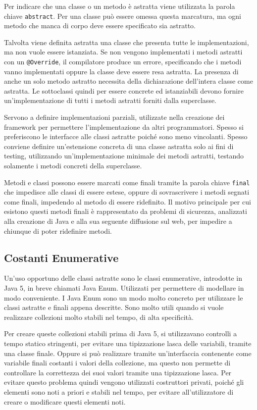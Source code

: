 \documentclass{article}
\numberwithin{equation}{subsection}
\begin{document}
Per indicare che una classe o un metodo è astratta viene utilizzata la parola chiave \verb|abstract|. 
Per una classe può essere omessa questa marcatura, ma ogni metodo che manca di corpo deve essere specificato sia astratto. 

Talvolta viene definita astratta una classe che presenta tutte le implementazioni, ma non vuole essere istanziata. 
Se non vengono implementati i metodi astratti con un \verb|@Override|, il compilatore produce un errore, specificando che i metodi vanno implementati oppure la classe 
deve essere resa astratta. 
La presenza di anche un solo metodo astratto necessita della dichiarazione dell'intera classe come astratta. 
Le sottoclassi quindi per essere concrete ed istanziabili devono fornire un'implementazione di tutti i metodi astratti forniti dalla superclasse. 

Servono a definire implementazioni parziali, utilizzate nella creazione dei framework per permettere l'implementazione da altri programmatori. 
Spesso si preferiscono le interfacce alle classi astratte poiché sono meno vincolanti. 
Spesso conviene definire un'estensione concreta di una classe astratta solo ai fini di testing, utilizzando un'implementazione minimale dei metodi astratti, testando solamente i metodi concreti della superclasse.  


Metodi e classi possono essere marcati come finali tramite la parola chiave \verb|final| che impedisce alle classi di essere estese, oppure di sovrascrivere i metodi 
segnati come finali, impedendo al metodo di essere ridefinito. Il motivo principale per cui esistono questi metodi finali è rappresentato da problemi di sicurezza, 
analizzati alla creazione di Java e alla sua seguente diffusione sul web, per impedire a chiunque di poter ridefinire metodi. 

\subsection{Costanti Enumerative}

Un'uso opportuno delle classi astratte sono le classi enumerative, introdotte in Java 5, in breve chiamati Java Enum. Utilizzati per permettere di modellare in modo 
conveniente. 
I Java Enum sono un modo molto concreto per utilizzare le classi astratte e finali appena descritte. Sono molto utili quando si vuole realizzare collezioni molto stabili 
nel tempo, di alta specificità. 

Per creare queste collezioni stabili prima di Java 5, si utilizzavano controlli a tempo statico stringenti, per evitare una tipizzazione lasca delle variabili, tramite una 
classe finale. Oppure si può realizzare tramite un'interfaccia contenente come variabile finali costanti i valori della collezione, ma questo non permette di controllare la 
correttezza dei suoi valori tramite una tipizzazione lasca. 
Per evitare questo problema quindi vengono utilizzati costruttori privati, poiché gli elementi sono noti a priori e stabili nel tempo, per evitare all'utilizzatore di creare 
o modificare questi elementi noti. 
\end{document}
